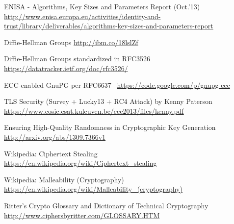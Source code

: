 \begin{itemize*}
  \item ENISA - Algorithms, Key Sizes and Parameters Report (Oct.'13) \url{http://www.enisa.europa.eu/activities/identity-and-trust/library/deliverables/algorithms-key-sizes-and-parameters-report}
  \item Diffie-Hellman Groups \url{http://ibm.co/18lslZf}
  \item Diffie-Hellman Groups standardized in RFC3526~\cite{rfc3526} \url{https://datatracker.ietf.org/doc/rfc3526/}
  \item ECC-enabled GnuPG per RFC6637~\cite{rfc6637} \url{https://code.google.com/p/gnupg-ecc}
  \item TLS Security (Survey + Lucky13 + RC4 Attack) by Kenny Paterson \url{https://www.cosic.esat.kuleuven.be/ecc2013/files/kenny.pdf}
  \item Ensuring High-Quality Randomness in Cryptographic Key Generation \url{http://arxiv.org/abs/1309.7366v1}
  \item Wikipedia: Ciphertext Stealing \url{https://en.wikipedia.org/wiki/Ciphertext_stealing}
  \item Wikipedia: Malleability (Cryptography) \url{https://en.wikipedia.org/wiki/Malleability_(cryptography)}
  \item Ritter's Crypto Glossary and Dictionary of Technical Cryptography \url{http://www.ciphersbyritter.com/GLOSSARY.HTM}
\end{itemize*}

